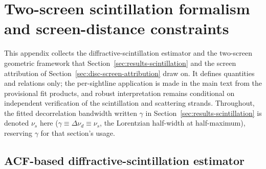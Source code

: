 %

\section{Two-screen scintillation formalism and screen-distance constraints}
\label{app:twoscreen}
\renewcommand{\theHequation}{\thesection.\arabic{equation}}

This appendix collects the diffractive-scintillation estimator and the
two-screen geometric framework that Section~\ref{sec:results-scintillation}
and the screen attribution of Section~\ref{sec:disc-screen-attribution} draw
on. It defines quantities and relations only; the per-sightline application
is made in the main text from the provisional fit products, and
robust interpretation remains conditional on independent verification of the
scintillation and scattering strands. Throughout, the fitted decorrelation
bandwidth written $\gamma$ in Section~\ref{sec:results-scintillation} is
denoted $\nu_{s}$ here ($\gamma\equiv\Delta\nu_{d}\equiv\nu_{s}$, the
Lorentzian half-width at half-maximum), reserving $\gamma$ for that section's
usage.

\subsection{ACF-based diffractive-scintillation estimator}
\label{app:acf}

